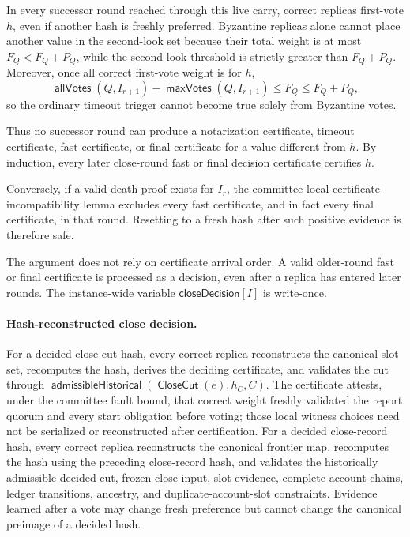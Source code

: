 \documentclass[sigplan,twocolumn,review,anonymous]{acmart}
\newcommand{\func}[1]{\operatorname{\mathsf{#1}}}
\newcommand{\allVotes}{\func{allVotes}}
\newcommand{\maxVotes}{\func{maxVotes}}
\newcommand{\CloseCut}{\func{CloseCut}}
\newcommand{\closeDecision}{\mathsf{closeDecision}}
\newcommand{\admissibleHistorical}{\func{admissibleHistorical}}
\begin{document}
In every successor round reached through this live carry, correct replicas first-vote \(h\), even if
another hash is freshly preferred.  Byzantine replicas alone cannot place another value in the
second-look set because their total weight is at most \(F_Q<F_Q+P_Q\), while the second-look threshold
is strictly greater than \(F_Q+P_Q\).  Moreover, once all correct first-vote weight is for \(h\),
\[
\allVotes(Q,I_{r+1})-\maxVotes(Q,I_{r+1})
\le F_Q
\le F_Q+P_Q,
\]
so the ordinary timeout trigger cannot become true solely from Byzantine votes.

Thus no successor round can produce a notarization certificate, timeout certificate, fast certificate,
or final certificate for a value different from \(h\).  By induction, every later close-round fast or
final decision certificate certifies \(h\).

Conversely, if a valid death proof exists for \(I_r\), the committee-local certificate-incompatibility lemma excludes every
fast certificate, and in fact every final certificate, in that round.  Resetting to a fresh hash after
such positive evidence is therefore safe.

The argument does not rely on certificate arrival order.  A valid older-round fast or final certificate
is processed as a decision, even after a replica has entered later rounds.  The instance-wide variable \(\closeDecision[I]\) is
write-once.

\paragraph{Hash-reconstructed close decision.}
For a decided close-cut hash, every correct replica reconstructs the canonical slot set, recomputes the
hash, derives the deciding certificate, and validates the cut through
\(\admissibleHistorical(\CloseCut(e),h_C,C)\).  The certificate attests, under the committee fault
bound, that correct weight freshly validated the report quorum and every start obligation before voting;
those local witness choices need not be serialized or reconstructed after certification.  For a decided
close-record hash, every correct replica reconstructs the canonical frontier map, recomputes the hash
using the preceding close-record hash, and validates the historically admissible decided cut, frozen
close input, slot evidence, complete account chains, ledger transitions, ancestry, and
duplicate-account-slot constraints.  Evidence learned after a vote may change fresh preference but
cannot change the canonical preimage of a decided hash.
\end{document}
